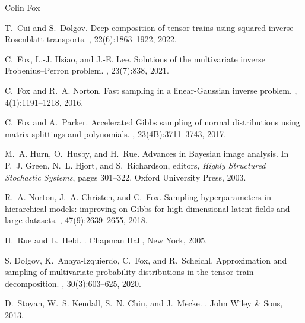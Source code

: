 \documentclass{owrart}
\theoremstyle{plain}
\begin{document}
\begin{talk}{Colin Fox}
\begin{thebibliography}{10}
T.~Cui and S.~Dolgov.
\newblock Deep composition of tensor-trains using squared inverse {R}osenblatt
  transports.
, 22(6):1863--1922,
  2022.

C.~Fox, L.-J. Hsiao, and J.-E. Lee.
\newblock Solutions of the multivariate inverse {F}robenius--{P}erron problem.
, 23(7):838, 2021.

C.~Fox and R.~A. Norton.
\newblock Fast sampling in a linear-{G}aussian inverse problem.
,
  4(1):1191--1218, 2016.

C.~Fox and A.~Parker.
\newblock Accelerated {G}ibbs sampling of normal distributions using matrix
  splittings and polynomials.
, 23(4B):3711--3743, 2017.

M.~A. Hurn, O.~Husby, and H.~Rue.
\newblock Advances in {B}ayesian image analysis.
\newblock In P.~J. Green, N.~L. Hjort, and S.~Richardson, editors, {\em Highly
  Structured Stochastic Systems}, pages 301--322. Oxford University Press,
  2003.

R.~A. Norton, J.~A. Christen, and C.~Fox.
\newblock Sampling hyperparameters in hierarchical models: improving on {Gibbs}
  for high-dimensional latent fields and large datasets.
,
  47(9):2639--2655, 2018.

H.~Rue and L.~Held.
.
\newblock Chapman Hall, New York, 2005.

{S. Dolgov}, K.~Anaya-Izquierdo, C.~Fox, and R.~Scheichl.
\newblock Approximation and sampling of multivariate probability distributions
  in the tensor train decomposition.
, 30(3):603--625, 2020.

D.~Stoyan, W.~S. Kendall, S.~N. Chiu, and J.~Mecke.
.
\newblock John Wiley \& Sons, 2013.

\end{thebibliography}



% 
% 

\end{talk}
\end{document}
